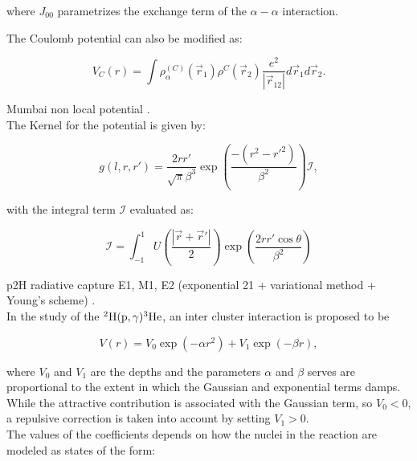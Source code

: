\documentclass[openany]{book}
\begin{document}
where $J_{00}$ parametrizes the exchange term of the $\alpha-\alpha$ interaction.

The Coulomb potential can also be modified as: 

\begin{equation}\label{potential_nonLocal_coulomb}
	V_{C}(r) = \int \rho^{(C)}_\alpha(\vec r_1) \rho^{{C}}(\vec r_2) \frac{e^2}{|\vec r_{12}|} d\vec r_1 d\vec r_2.
\end{equation}


Mumbai non local potential \cite{upadhyay_bhagwat_jain_2017}. \\

The Kernel for the potential is given by: 

\begin{equation}\label{potential_nonLocal_Mumbai_kernel}
	g(l, r, r') = \frac{2rr'}{\sqrt{\pi}\beta^3} \exp {\left(\frac{-(r^2 - r'^2)}{\beta^2}\right)} \mathcal{I},
\end{equation}

with the integral term $\mathcal{I}$ evaluated as: 

\begin{equation}\label{potential_nonLocal_Mumbai_kernel_integral}
	\mathcal{I} = \int_{-1}^{1}{U \left(\frac{|\vec r + \vec r'|}{2} \right) \exp \left(\frac{2rr'\cos \theta}{\beta^2}\right)}
\end{equation}

p2H radiative capture E1, M1, E2 (exponential 21 + variational method + Young's scheme) \cite{dubovichenko_dzhazairov-kakhramanov_2009}. \\

In the study of the $\mathrm{{}^{2}H(p, \gamma){}^{3}He}$, an inter cluster interaction is proposed to be 


\begin{equation}\label{eq:potential_intercluster_12}
		V(r) = V_0 \exp (-\alpha r^2) + V_1 \exp (-\beta r),
\end{equation}

where $V_0$ and $V_1$ are the depths and the parameters $\alpha$ and $\beta$ serves are proportional to the extent in which the Gaussian and exponential terms damps. While the attractive contribution is associated with the Gaussian term, so $V_0 < 0$, a repulsive correction is taken into account by setting  $V_1 > 0$. \\

The values of the coefficients depends on how the nuclei in the reaction are modeled as states of the form: 
\end{document}
